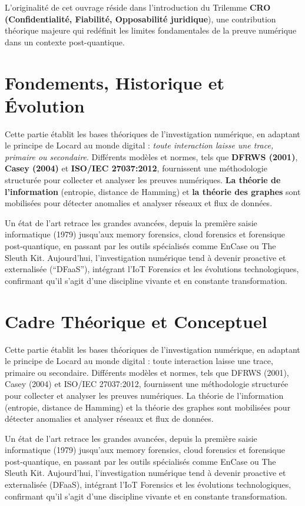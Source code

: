\documentclass[memoire, 12pt]{report}
\begin{document}
\newpage
\par L’originalité de cet ouvrage réside dans l’introduction du Trilemme \textbf{CRO (Confidentialité, Fiabilité, Opposabilité juridique}), une contribution théorique majeure qui redéfinit les limites fondamentales de la preuve numérique dans un contexte post-quantique.


\section*{Fondements, Historique et Évolution} 
Cette partie établit les bases théoriques de l'investigation numérique, en adaptant le principe de Locard au monde digital : \textit{toute interaction laisse une trace, primaire ou secondaire}. Différents modèles et normes, tels que \textbf{DFRWS (2001)}, \textbf{Casey (2004)} et \textbf{ISO/IEC 27037:2012}, fournissent une méthodologie structurée pour collecter et analyser les preuves numériques. \textbf{La théorie de l'information} (entropie, distance de Hamming) et \textbf{la théorie des graphes} sont mobilisées pour détecter anomalies et analyser réseaux et flux de données.

Un état de l'art retrace les grandes avancées, depuis la première saisie informatique (1979) jusqu'aux memory forensics, cloud forensics et forensique post-quantique, en passant par les outils spécialisés comme EnCase ou The Sleuth Kit. Aujourd'hui, l'investigation numérique tend à devenir proactive et externalisée (``DFaaS''), intégrant l'IoT Forensics et les évolutions technologiques, confirmant qu'il s'agit d'une discipline vivante et en constante transformation.



\section*{Cadre Théorique et Conceptuel}
Cette partie établit les bases théoriques de l’investigation numérique, en adaptant le principe de Locard au monde digital : toute interaction laisse une trace, primaire ou secondaire. Différents modèles et normes, tels que DFRWS (2001), Casey (2004) et ISO/IEC 27037:2012, fournissent une méthodologie structurée pour collecter et analyser les preuves numériques. La théorie de l’information (entropie, distance de Hamming) et la théorie des graphes sont mobilisées pour détecter anomalies et analyser réseaux et flux de données.

Un état de l’art retrace les grandes avancées, depuis la première saisie informatique (1979) jusqu’aux memory forensics, cloud forensics et forensique post-quantique, en passant par les outils spécialisés comme EnCase ou The Sleuth Kit. Aujourd’hui, l’investigation numérique tend à devenir proactive et externalisée (DFaaS), intégrant l’IoT Forensics et les évolutions technologiques, confirmant qu’il s’agit d’une discipline vivante et en constante transformation.
\end{document}
